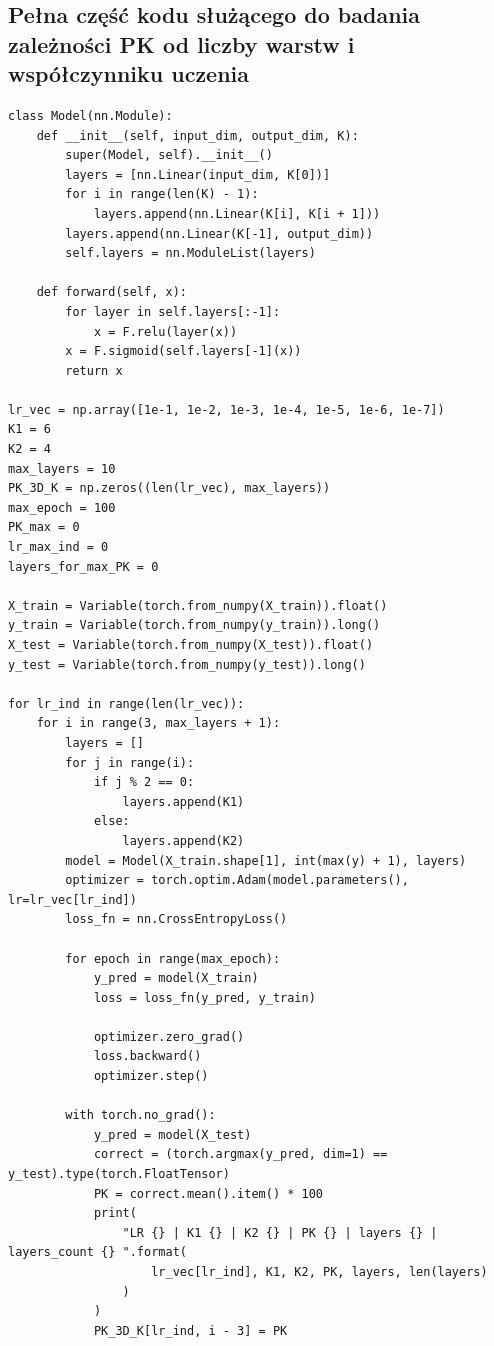 \documentclass{article}
\begin{document}
\newpage
\subsection{Pełna część kodu służącego do badania zależności PK od liczby warstw i współczynniku uczenia}
\begin{verbatim}
class Model(nn.Module):
    def __init__(self, input_dim, output_dim, K):
        super(Model, self).__init__()
        layers = [nn.Linear(input_dim, K[0])]
        for i in range(len(K) - 1):
            layers.append(nn.Linear(K[i], K[i + 1]))
        layers.append(nn.Linear(K[-1], output_dim))
        self.layers = nn.ModuleList(layers)

    def forward(self, x):
        for layer in self.layers[:-1]:
            x = F.relu(layer(x))
        x = F.sigmoid(self.layers[-1](x))
        return x

lr_vec = np.array([1e-1, 1e-2, 1e-3, 1e-4, 1e-5, 1e-6, 1e-7])
K1 = 6
K2 = 4
max_layers = 10
PK_3D_K = np.zeros((len(lr_vec), max_layers))
max_epoch = 100
PK_max = 0
lr_max_ind = 0
layers_for_max_PK = 0

X_train = Variable(torch.from_numpy(X_train)).float()
y_train = Variable(torch.from_numpy(y_train)).long()
X_test = Variable(torch.from_numpy(X_test)).float()
y_test = Variable(torch.from_numpy(y_test)).long()

for lr_ind in range(len(lr_vec)):
    for i in range(3, max_layers + 1):
        layers = []
        for j in range(i):
            if j % 2 == 0:
                layers.append(K1)
            else:
                layers.append(K2)
        model = Model(X_train.shape[1], int(max(y) + 1), layers)
        optimizer = torch.optim.Adam(model.parameters(), lr=lr_vec[lr_ind])
        loss_fn = nn.CrossEntropyLoss()

        for epoch in range(max_epoch):
            y_pred = model(X_train)
            loss = loss_fn(y_pred, y_train)

            optimizer.zero_grad()
            loss.backward()
            optimizer.step()

        with torch.no_grad():
            y_pred = model(X_test)
            correct = (torch.argmax(y_pred, dim=1) == y_test).type(torch.FloatTensor)
            PK = correct.mean().item() * 100
            print(
                "LR {} | K1 {} | K2 {} | PK {} | layers {} | layers_count {} ".format(
                    lr_vec[lr_ind], K1, K2, PK, layers, len(layers)
                )
            )
            PK_3D_K[lr_ind, i - 3] = PK


\end{verbatim}
\end{document}
